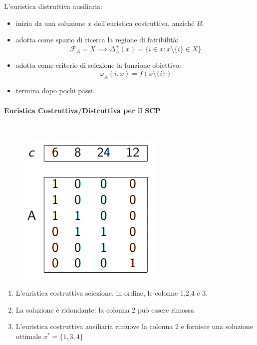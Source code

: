 \documentclass{article}
\begin{document}
L'euristica distruttiva ausiliaria:
\begin{itemize}
    \item inizia da una soluzione $x$ dell'euristica costruttiva, anziché $B$.
    \item adotta come spazio di ricerca la regione di fattibilità:
          $$\mathcal{F}_A=X\implies\Delta_A^+{(x)}=\{i\in x:x\setminus\{i\}\in X\}$$
    \item adotta come criterio di selezione la funzione obiettivo:
          $$\varphi_A(i,x)=f(x\setminus\{i\})$$
    \item termina dopo pochi passi.
\end{itemize}

\paragraph{Euristica Costruttiva/Distruttiva per il SCP}\mbox{}\\
\begin{figure}[H]
    \centering
    \includegraphics[scale=0.7]{images/scp_cd.png}
\end{figure}
\begin{enumerate}
    \item L'euristica costruttiva selezione, in ordine, le colonne 1,2,4 e 3.
    \item La soluzione è ridondante: la colonna 2 può essere rimossa
    \item L'euristica costruttiva ausiliaria rimuove la colonna 2 e fornisce una soluzione ottimale $x^*=\{1,3,4\}$
\end{enumerate}
\end{document}

